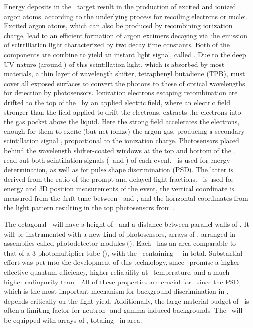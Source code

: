 Energy deposits in the \LAr\ target result in the production of excited and ionized argon atoms, according to the underlying process for recoiling electrons or nuclei. Excited argon atoms, which can also be produced by recombining ionization charge, lead to an efficient formation of argon excimers decaying via the emission of scintillation light characterized by two decay time constants. Both of the components are combine to yield an instant light signal, called \SOne. Due to the deep UV nature (around \ArWaveLength) of this scintillation light, which is absorbed by most materials, a thin layer of wavelength shifter, tetraphenyl butadiene (TPB), must cover all exposed surfaces to convert the photons to those of optical wavelengths for detection by photosensors. Ionization electrons escaping recombination are drifted to the top of the \LAr\ by an applied electric field, where an electric field stronger than the field applied to drift the electrons, extracts the electrons into the gas pocket above the liquid. Here the strong field accelerates the electrons, enough for them to excite (but not ionize) the argon gas, producing a secondary scintillation signal \STwo, proportional to the ionization charge.  Photosensors placed behind the wavelength shifter-coated windows at the top and bottom of the \TPC, read out both scintillation signals (\SOne\ and \STwo) of each event. \SOne\ is used for energy determination, as well as for pulse shape discrimination (PSD).  The latter is derived from the ratio of the prompt and delayed light fractions. \STwo\ is used for energy and 3D position measurements of the event, the vertical coordinate is measured from the drift time between \SOne\ and \STwo, and the horizontal coordinates from the light pattern resulting in the top photosensors from \STwo. 

The octagonal \LArTPC\ will have a height of \DSkActiveHeight\ and a distance between parallel walls of \DSkActiveDiameter.  It will be instrumented with a new kind of photosensors, arrays of \SiPMs, arranged in assemblies called photodetector modules (\DSkPdms). Each \DSkPdm\ has an area comparable to that of a \SI{3}{\inch} photomultiplier tube (\PMT ), with the \LArTPC\ containing \DSkTilesNumber\ \DSkPdms\ in total.  Substantial effort was put into the development of this technology, since \SiPMs\ promise a higher effective quantum efficiency, higher reliability at \LAr\ temperature, and a much higher radiopurity than \PMTs. All of these properties are crucial for \DSks\ since the PSD, which is the most important mechanism for background discrimination in \LAr, depends critically on the light yield.  Additionally, the large material budget of \PMTs\ is often a limiting factor for neutron- and gamma-induced backgrounds. The \LArTPC\ will be equipped with arrays of \SiPMs, totaling \DSkTilesArea\ in area.

